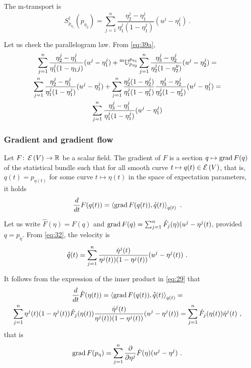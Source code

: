 \documentclass[12pt,a4paper]{amsart}
\newcommand{\transposed}{\dagger}
\theoremstyle{remark}
\begin{document}
The m-transport is
\begin{equation}
  \label{eq:53}
  S^\transposed _{p_{\eta_1}}(p_{\eta_2}) = \sum_{j=1}^n \frac{\eta^j_2-\eta^j_1}{\eta^j_1(1-\eta^j_1)} (u^j - \eta^j_1) \ . 
\end{equation}

 Let us check the parallelogram law. From \cref{eq:39a},
 \begin{multline}
   \label{eq:48}
   \sum_{j=1}^n \frac{\eta^j_2-\eta_1^j}{\eta_1^j(1-\eta_1j)}(u^j-\eta_1^j) + \mtransport {p_{\eta_2}}{p_{\eta_1}} \sum_{j=1}^n \frac{\eta^j_3-\eta_2^j}{\eta_2^j(1-\eta_2^y)}(u^j-\eta_2^j) = \\
   \sum_{j=1}^n \frac{\eta^j_2-\eta_1^j}{\eta_1^j(1-\eta_1^j)}(u^j-\eta_1^j) + \sum_{j=1}^n  \frac{\eta^j_2(1-\eta^j_2)} {\eta^j_1(1-\eta^j_1)} \frac{\eta^j_3-\eta_2^j}{\eta_2^j(1-\eta_2^j)}(u^j-\eta_1^j) = \\
   \sum_{j=1}^n \frac{\eta^j_3-\eta_1^j}{\eta_1^j(1-\eta_1^j)}(u^j-\eta_1^j) 
 \end{multline}

\subsubsection{Gradient and gradient flow}
\label{sec:gradient}

Let $F \colon \operatorname{\mathcal E}\left(V\right) \to \mathbb{R}$ be a scalar field. The gradient of $F$ is a section  $q \mapsto \operatorname{grad} F(q)$ of the statistical bundle such that for all smooth curve $t \mapsto q(t) \in \operatorname{\mathcal E}\left(V\right)$, that is, $q(t) = p_{\eta(t)}$ for some curve $t \mapsto \eta(t)$ in the space of expectation parameters, it holds
\begin{equation}
  \label{eq:gradient}
  \derivby t F(q(t)) = \scalarat {q(t)} {\Grad F(q(t))}{\velocity q(t)} \ .
\end{equation}

Let us write $\hat F(\eta) = F(q)$ and $\operatorname{grad} F(q) = \sum_{j=1}^n \hat F_j(\eta) (u^j - \eta^j(t)$, provided $q = p_\eta$. From \cref{eq:32}, the velocity is
\begin{equation}
  \label{eq:55}
  \velocity q(t) = \sum_{j=1}^n \frac{\dot \eta^j(t)} {\eta^j(t))(1 - \eta^j(t))} (u^j - \eta^j(t)) \ .
\end{equation}

It follows from the expression of the inner product in \cref{eq:29} that 
\begin{multline}
  \label{eq:54}
  \derivby t \hat F(\eta(t)) = \scalarat {q(t)} {\Grad F(q(t))}{\velocity q(t)} = \\ \sum_{j=1}^n \eta^j(t)(1-\eta^j(t)) \hat F_j(\eta(t)) \frac{\dot \eta^j(t)} {\eta^j(t))(1 - \eta^j(t))} (u^j - \eta^j(t)) = \sum_{j=1}^n \hat F_j(\eta(t)) \dot \eta^j(t) \ , 
\end{multline}
that is
\begin{equation}
  \label{eq:58}
  \Grad F(p_\eta) = \sum_{j=1}^n \pderivby {\eta^j} \hat F(\eta) (u^j - \eta^j) \ .
\end{equation}
\end{document}
